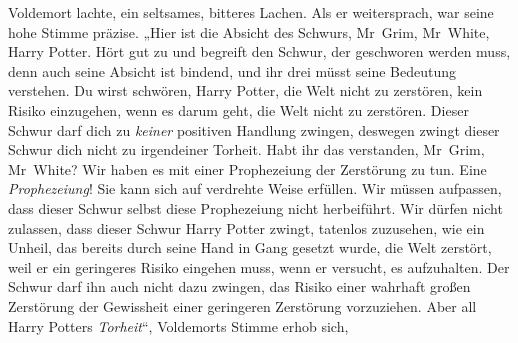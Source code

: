 Voldemort lachte, ein seltsames, bitteres Lachen. Als er weitersprach, war seine hohe Stimme präzise.
„Hier ist die Absicht des Schwurs, Mr~Grim, Mr~White, Harry Potter. Hört gut zu und begreift den Schwur, der geschworen werden muss, denn auch seine Absicht ist bindend, und ihr drei müsst seine Bedeutung verstehen. Du wirst schwören, Harry Potter, die Welt nicht zu zerstören, kein Risiko einzugehen, wenn es darum geht, die Welt nicht zu zerstören.
Dieser Schwur darf dich zu \emph{keiner} positiven Handlung zwingen, deswegen zwingt dieser Schwur dich nicht zu irgendeiner Torheit. Habt ihr das verstanden, Mr~Grim, Mr~White? Wir haben es mit einer Prophezeiung der Zerstörung zu tun. Eine \emph{Prophezeiung}! Sie kann sich auf verdrehte Weise erfüllen. Wir müssen aufpassen, dass dieser Schwur selbst diese Prophezeiung nicht herbeiführt. Wir dürfen nicht zulassen, dass dieser Schwur Harry Potter zwingt, tatenlos zuzusehen, wie ein Unheil, das bereits durch seine Hand in Gang gesetzt wurde, die Welt zerstört, weil er ein geringeres Risiko eingehen muss, wenn er versucht, es aufzuhalten. Der Schwur darf ihn auch nicht dazu zwingen, das Risiko einer wahrhaft großen Zerstörung der Gewissheit einer geringeren Zerstörung vorzuziehen. Aber all Harry Potters \emph{Torheit}“,
Voldemorts Stimme erhob sich,
